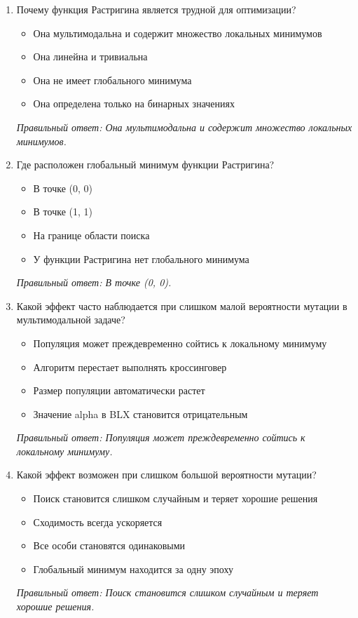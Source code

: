 \begin{enumerate}[label=\textbf{\arabic*.}, leftmargin=0pt, itemsep=1.2em]
\item Почему функция Растригина является трудной для оптимизации?
\begin{itemize}[label=$\square$, leftmargin=1.5cm, itemsep=0.2em, topsep=0.3em]
\item Она мультимодальна и содержит множество локальных минимумов
\item Она линейна и тривиальна
\item Она не имеет глобального минимума
\item Она определена только на бинарных значениях
\end{itemize}
{\small\textit{Правильный ответ: Она мультимодальна и содержит множество локальных минимумов.}}

\item Где расположен глобальный минимум функции Растригина?
\begin{itemize}[label=$\square$, leftmargin=1.5cm, itemsep=0.2em, topsep=0.3em]
\item В точке (0, 0)
\item В точке (1, 1)
\item На границе области поиска
\item У функции Растригина нет глобального минимума
\end{itemize}
{\small\textit{Правильный ответ: В точке (0, 0).}}

\item Какой эффект часто наблюдается при слишком малой вероятности мутации в мультимодальной задаче?
\begin{itemize}[label=$\square$, leftmargin=1.5cm, itemsep=0.2em, topsep=0.3em]
\item Популяция может преждевременно сойтись к локальному минимуму
\item Алгоритм перестает выполнять кроссинговер
\item Размер популяции автоматически растет
\item Значение alpha в BLX становится отрицательным
\end{itemize}
{\small\textit{Правильный ответ: Популяция может преждевременно сойтись к локальному минимуму.}}

\item Какой эффект возможен при слишком большой вероятности мутации?
\begin{itemize}[label=$\square$, leftmargin=1.5cm, itemsep=0.2em, topsep=0.3em]
\item Поиск становится слишком случайным и теряет хорошие решения
\item Сходимость всегда ускоряется
\item Все особи становятся одинаковыми
\item Глобальный минимум находится за одну эпоху
\end{itemize}
{\small\textit{Правильный ответ: Поиск становится слишком случайным и теряет хорошие решения.}}


\end{enumerate}

